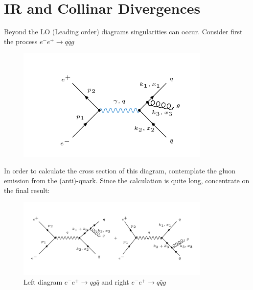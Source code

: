 \section{IR and Collinar Divergences}
Beyond the LO (Leading order) diagrams singularities can occur. Consider first the process $ e^- e^+ \rightarrow q\bar{q}g $

\begin{figure}[ht!]
\centering
\includegraphics[width=0.85\textwidth]{images/Intro/IRCol.png}
\end{figure}

In order to calculate the cross section of this diagram, contemplate the gluon emission from the (anti)-quark. Since the calculation is quite long, concentrate on the final result:
\begin{figure}[ht!]
\centering
\includegraphics[width=0.85\textwidth]{images/Intro/IRColMatrix.png}
\caption{Left diagram $  e^- e^+ \rightarrow qg\bar{q} $ and right $ e^- e^+ \rightarrow q\bar{q}g $}
\end{figure}

